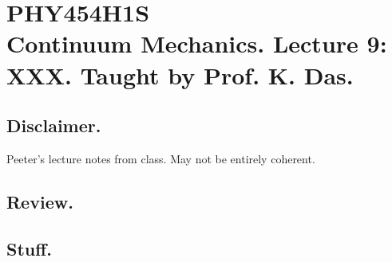 
%

\chapter{PHY454H1S\\Continuum Mechanics.  Lecture 9: XXX.  Taught by Prof. K. Das.}
\label{chap:continuumL9}
{}
\date{Feb 8, 2012}

\beginArtWithToc

\section{Disclaimer.}

Peeter's lecture notes from class.  May not be entirely coherent.

\section{Review.}

\section{Stuff.}


\EndArticle
